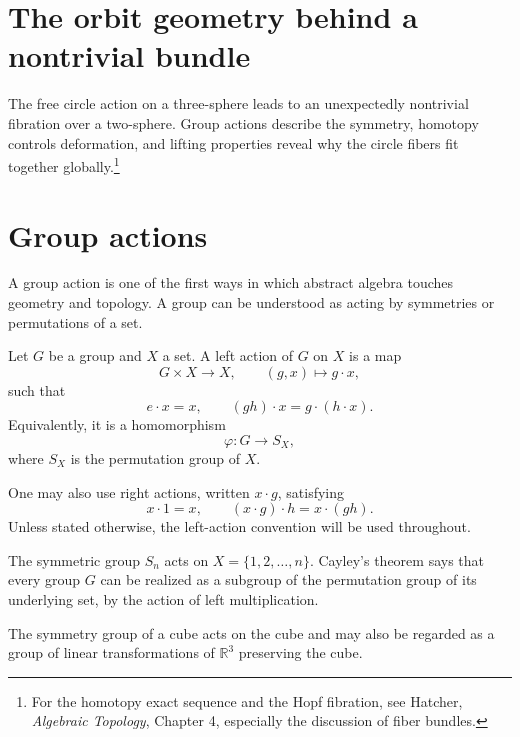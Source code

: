 
\section{The orbit geometry behind a nontrivial bundle}

The free circle action on a three-sphere leads to an unexpectedly nontrivial fibration over a two-sphere. Group actions describe the symmetry, homotopy controls deformation, and lifting properties reveal why the circle fibers fit together globally.\footnote{For the homotopy exact sequence and the Hopf fibration, see Hatcher, \emph{Algebraic Topology}, Chapter 4, especially the discussion of fiber bundles.}

\section{Group actions}

A group action is one of the first ways in which abstract algebra touches geometry and topology.  A group can be understood as acting by symmetries or permutations of a set.

\begin{definition}
Let \(G\) be a group and \(X\) a set.  A left action of \(G\) on \(X\) is a map
\[
  G\times X\to X,\qquad (g,x)\mapsto g\cdot x,
\]
such that
\[
  e\cdot x=x,\qquad (gh)\cdot x=g\cdot(h\cdot x).
\]
Equivalently, it is a homomorphism
\[
  \varphi:G\to S_X,
\]
where \(S_X\) is the permutation group of \(X\).
\end{definition}

\begin{remark}
One may also use right actions, written \(x\cdot g\), satisfying
\[
  x\cdot 1=x,\qquad (x\cdot g)\cdot h=x\cdot(gh).
\]
Unless stated otherwise, the left-action convention will be used throughout.
\end{remark}

\begin{example}
The symmetric group \(S_n\) acts on \(X=\{1,2,\dots,n\}\).  Cayley's theorem says that every group \(G\) can be realized as a subgroup of the permutation group of its underlying set, by the action of left multiplication.
\end{example}

\begin{example}
The symmetry group of a cube acts on the cube and may also be regarded as a group of linear transformations of \(\mathbb R^3\) preserving the cube.
\end{example}

